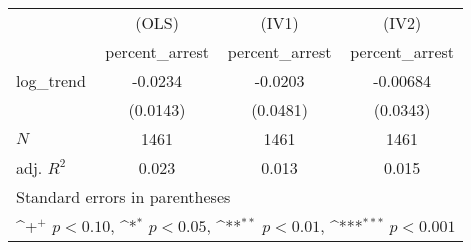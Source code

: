 {
\def\sym#1{\ifmmode^{#1}\else\(^{#1}\)\fi}
\begin{tabular}{l*{3}{c}}
\hline\hline
            &\multicolumn{1}{c}{(OLS)}&\multicolumn{1}{c}{(IV1)}&\multicolumn{1}{c}{(IV2)}\\
            &\multicolumn{1}{c}{percent\_arrest}&\multicolumn{1}{c}{percent\_arrest}&\multicolumn{1}{c}{percent\_arrest}\\
\hline
log\_trend   &     -0.0234         &     -0.0203         &    -0.00684         \\
            &    (0.0143)         &    (0.0481)         &    (0.0343)         \\
\hline
\(N\)       &        1461         &        1461         &        1461         \\
adj. \(R^{2}\)&       0.023         &       0.013         &       0.015         \\
\hline\hline
\multicolumn{4}{l}{\footnotesize Standard errors in parentheses}\\
\multicolumn{4}{l}{\footnotesize \sym{+} \(p<0.10\), \sym{*} \(p<0.05\), \sym{**} \(p<0.01\), \sym{***} \(p<0.001\)}\\
\end{tabular}
}
